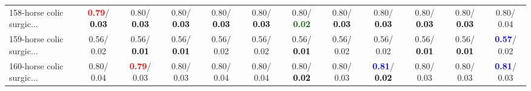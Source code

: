 \begin{table}[h]
\begin{center}
{\begin{tabular}{lc|c|c|c|c|c|c|c|c|c|c}
158-horse colic surgic... & \textcolor{red}{\textbf{  0.79}}/\textcolor{black}{\textbf{  0.03}} &   0.80/\textcolor{black}{\textbf{  0.03}} &   0.80/\textcolor{black}{\textbf{  0.03}} &   0.80/\textcolor{black}{\textbf{  0.03}} &   0.80/\textcolor{black}{\textbf{  0.03}} &   0.80/\textcolor{darkgreen}{\textbf{  0.02}} &   0.80/\textcolor{black}{\textbf{  0.03}} &   0.80/\textcolor{black}{\textbf{  0.03}} &   0.80/\textcolor{black}{\textbf{  0.03}} &   0.80/\textcolor{black}{\textbf{  0.03}} &   0.80/  0.04 \\
159-horse colic surgic... &   0.56/  0.02 &   0.56/\textcolor{black}{\textbf{  0.01}} &   0.56/\textcolor{black}{\textbf{  0.01}} &   0.56/  0.02 &   0.56/  0.02 &   0.56/\textcolor{black}{\textbf{  0.01}} &   0.56/  0.02 &   0.56/  0.02 &   0.56/\textcolor{black}{\textbf{  0.01}} &   0.56/\textcolor{black}{\textbf{  0.01}} & \textcolor{blue}{\textbf{  0.57}}/  0.02 \\
160-horse colic surgic... &   0.80/  0.04 & \textcolor{red}{\textbf{  0.79}}/  0.03 &   0.80/  0.03 &   0.80/  0.04 &   0.80/  0.04 &   0.80/\textcolor{black}{\textbf{  0.02}} &   0.80/  0.03 & \textcolor{blue}{\textbf{  0.81}}/\textcolor{black}{\textbf{  0.02}} &   0.80/  0.03 &   0.80/  0.03 & \textcolor{blue}{\textbf{  0.81}}/  0.03 \\\end{tabular}}\label{stratsALCKappa4Allalla}
\end{center}
\end{table}
